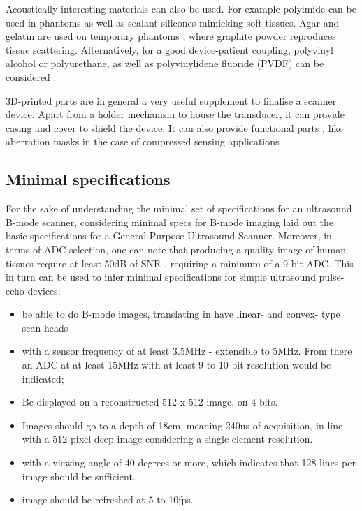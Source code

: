 \documentclass{article}
\begin{document}
Acoustically interesting materials can also be used. For example polyimide \cite{xu_high-frequency_2008,lei_sun_high-frame_2008} can be used in phantoms as well as sealant silicones \cite{lorenzo_experimental_2009} mimicking soft tissues. Agar and gelatin are used on temporary phantoms \cite{vogt_development_2005,chun_ultrasound_2015}, where graphite powder reproduces tissue scattering. Alternatively, for a good device-patient coupling, polyvinyl alcohol or polyurethane, as well as polyvinylidene fluoride (PVDF) can be considered \cite{sikdar_novel_2014}.

3D-printed parts are in general a very useful supplement to finalise a scanner device. Apart from a holder mechanism to house the transducer, it can provide casing and cover to shield the device. It can also provide functional parts , like aberration masks in the case of compressed sensing applications \cite{kruizinga_compressive_2017}.

\subsection{Minimal specifications}

For the sake of understanding the minimal set of specifications for an ultrasound B-mode scanner, considering minimal specs for B-mode imaging \cite{kurjak_use_1986} laid out the basic specifications for a General Purpose Ultrasound Scanner. Moreover, in terms of ADC selection, one can note that producing a quality image of human tissues require at least 50dB of SNR \cite{attarzadeh_low-power_2017}, requiring a minimum of a 9-bit ADC. This in turn can be used to infer minimal specifications for simple ultrasound pulse-echo devices:

\begin{itemize}
\item be able to do B-mode images, translating in have linear- and convex- type scan-heads
\item with a sensor frequency of at least 3.5MHz - extensible to 5MHz. From there an ADC at at least 15MHz with at least 9 to 10 bit resolution would be indicated;
\item Be displayed on a reconstructed 512 x 512 image, on 4 bits.
\item Images should go to a depth of 18cm, meaning 240us of acquisition, in line with a 512 pixel-deep image considering a single-element resolution. 
\item with a viewing angle of 40 degrees or more, which indicates that 128 lines per image should be sufficient.
\item image should be refreshed at 5 to 10fps.
\end{itemize}
\end{document}
